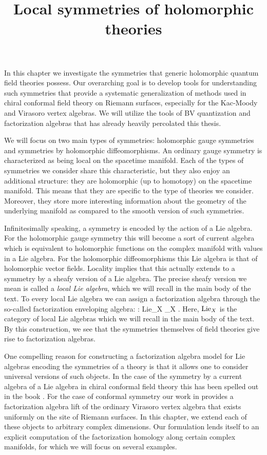 \documentclass[10pt]{amsart}
\title{Local symmetries of holomorphic theories}
\begin{document}
\maketitle
\tableofcontents

In this chapter we investigate the symmetries that generic holomorphic quantum field theories possess.
Our overarching goal is to develop tools for understanding such symmetries that provide a systematic generalization of methods used in chiral conformal field theory on Riemann surfaces, especially for the Kac-Moody and Virasoro vertex algebras.
We will utilize the tools of BV quantization and factorization algebras that has already heavily percolated this thesis.

We will focus on two main types of symmetries: holomorphic gauge symmetries and symmetries by holomorphic diffeomorphisms. 
An ordinary gauge symmetry is characterized as being local on the spacetime manifold. 
Each of the types of symmetries we consider share this characteristic, but they also enjoy an additional structure: they are holomorphic (up to homotopy) on the spacetime manifold. 
This means that they are specific to the type of theories we consider.
Moreover, they store more interesting information about the geometry of the underlying manifold as compared to the smooth version of such symmetries.

Infinitesimally speaking, a symmetry is encoded by the action of a Lie algebra.
For the holomorphic gauge symmetry this will become a sort of current algebra which is equivalent to holomorphic functions on the complex manifold with values in a Lie algebra.
For the holomorphic diffeomorphisms this Lie algebra is that of holomorphic vector fields.
Locality implies that this actually extends to a symmetry by a sheafy version of a Lie algebra. 
The precise sheafy version we mean is called a {\em local Lie algebra}, which we will recall in the main body of the text. 
To every local Lie algebra we can assign a factorization algebra through the so-called factorization enveloping algebra:
\ben
{} : {\rm Lie}_X _X .
\een
Here, ${\rm Lie}_X$ is the category of local Lie algebras which we will recall in the main body of the text.
By this construction, we see that the symmetries themselves of field theories give rise to factorization algebras. 

One compelling reason for constructing a factorization algebra model for Lie algebras encoding the symmetries of a theory is that it allows one to consider universal versions of such objects.
In the case of the symmetry by a current algebra of a Lie algebra in chiral conformal field theory this has been spelled out in the book \cite{CG}. 
For the case of conformal symmetry our work in \cite{BWVir} provides a factorization algebra lift of the ordinary Virasoro vertex algebra that exists uniformly on the site of Riemann surfaces. 
In this chapter, we extend each of these objects to arbitrary complex dimensions.
Our formulation lends itself to an explicit computation of the factorization homology along certain complex manifolds, for which we will focus on several examples.
\end{document}
